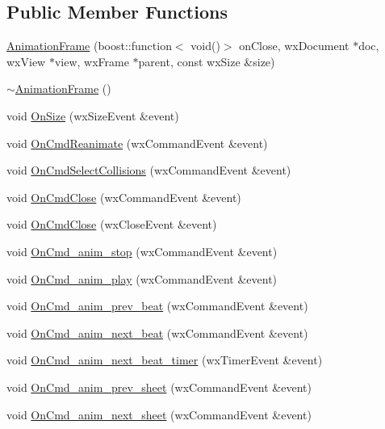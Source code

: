 \subsection*{Public Member Functions}
\begin{DoxyCompactItemize}
\item 
\hyperlink{a00012_a6f09b3d61b3daba0da8c3db0d76f0c9f}{Animation\-Frame} (boost\-::function$<$ void()$>$ on\-Close, wx\-Document $\ast$doc, wx\-View $\ast$view, wx\-Frame $\ast$parent, const wx\-Size \&size)
\item 
\hyperlink{a00012_af9da581313899adf881d6c1578cfa198}{$\sim$\-Animation\-Frame} ()
\item 
void \hyperlink{a00012_af77a9a0455fdb7a9e920c470a62e4892}{On\-Size} (wx\-Size\-Event \&event)
\item 
void \hyperlink{a00012_ae881dcbe9ae16c43aa2a3bdd78d7c826}{On\-Cmd\-Reanimate} (wx\-Command\-Event \&event)
\item 
void \hyperlink{a00012_ab8b90e1808b3873ddaed5c9e6210e21c}{On\-Cmd\-Select\-Collisions} (wx\-Command\-Event \&event)
\item 
void \hyperlink{a00012_a294a28e405a98129330f8e6d08bc863d}{On\-Cmd\-Close} (wx\-Command\-Event \&event)
\item 
void \hyperlink{a00012_aff7e18668d20664ce886829dc9849545}{On\-Cmd\-Close} (wx\-Close\-Event \&event)
\item 
void \hyperlink{a00012_a8afdb773f9dcb3048dac535ff170f1c3}{On\-Cmd\-\_\-anim\-\_\-stop} (wx\-Command\-Event \&event)
\item 
void \hyperlink{a00012_a79a27795f5e0327a93ae364af06608dc}{On\-Cmd\-\_\-anim\-\_\-play} (wx\-Command\-Event \&event)
\item 
void \hyperlink{a00012_a9571d8ba4321295994befdb087ac918b}{On\-Cmd\-\_\-anim\-\_\-prev\-\_\-beat} (wx\-Command\-Event \&event)
\item 
void \hyperlink{a00012_a59a91e0ab85132e7006d8b09a304162f}{On\-Cmd\-\_\-anim\-\_\-next\-\_\-beat} (wx\-Command\-Event \&event)
\item 
void \hyperlink{a00012_a1fbe1fb265f8cd92089f5db7564c571b}{On\-Cmd\-\_\-anim\-\_\-next\-\_\-beat\-\_\-timer} (wx\-Timer\-Event \&event)
\item 
void \hyperlink{a00012_adb11edc49b4894f0d44be0e4ca19dd02}{On\-Cmd\-\_\-anim\-\_\-prev\-\_\-sheet} (wx\-Command\-Event \&event)
\item 
void \hyperlink{a00012_a0ddd320c42cabac2cc297a38fd472c5c}{On\-Cmd\-\_\-anim\-\_\-next\-\_\-sheet} (wx\-Command\-Event \&event)

\end{DoxyCompactItemize}
